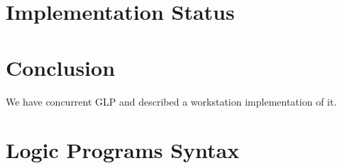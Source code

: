 \documentclass[runningheads,thm-restate]{llncs}
\begin{document}
\section{Implementation Status}\label{section:implementation-status}

\section{Conclusion}\label{section:conclusion}
We have concurrent GLP and described a workstation implementation of it. 




\appendix

\section{Logic Programs Syntax}\label{appendix:LP-synax}
\end{document}
